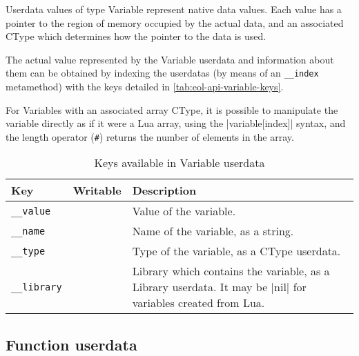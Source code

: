 Userdata values of type \textsf{Variable} represent native data values. Each
value has a pointer to the region of memory occupied by the actual data, and
an associated \textsf{CType} which determines how the pointer to the data is
used.

The actual value represented by the \textsf{Variable} userdata and information
about them can be obtained by indexing the userdatas (by means of an
\texttt{\_\_index} metamethod) with the keys detailed in
\autoref{tab:eol-api-variable-keys}.

For \textsf{Variable}s with an associated array \textsf{CType}, it is possible
to manipulate the variable directly as if it were a Lua array, using the
\Mlua|variable[index]| syntax, and the length operator (\texttt\#) returns
the number of elements in the array.

%

\begin{table}[ht]
	\centering
	\begin{tabular}{lcp{}}
		\toprule
		Key & Writable & Description \\
		\midrule
		\texttt{\_\_value} & \Tick & Value of the variable. \\
		\texttt{\_\_name} & & Name of the variable, as a string. \\
		\texttt{\_\_type} & & Type of the variable, as a \textsf{CType} userdata. \\
		\texttt{\_\_library} & & Library which contains the variable, as
			a \textsf{Library} userdata. It may be \Mlua|nil| for variables created from Lua. \\
		\bottomrule
	\end{tabular}
	\caption{Keys available in \textsf{Variable} userdata}
	\label{tab:eol-api-variable-keys}
\end{table}


\subsection{Function userdata}
	\label{sec:eol-api-function-t}

